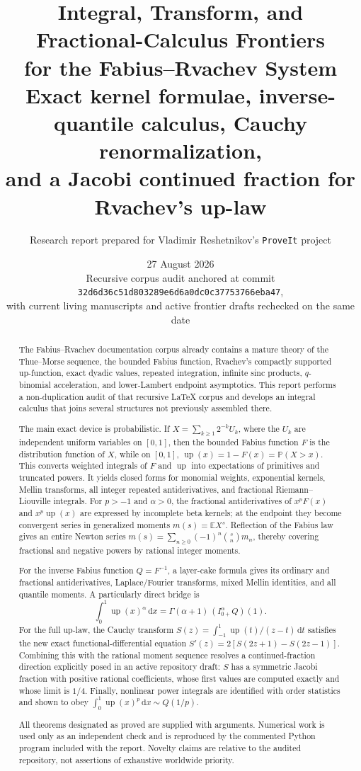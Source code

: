 \documentclass[11pt,oneside]{article}
\title{\bfseries Integral, Transform, and Fractional-Calculus Frontiers\\
for the Fabius--Rvachev System\\[0.45em]
\large Exact kernel formulae, inverse-quantile calculus, Cauchy renormalization,\\
and a Jacobi continued fraction for Rvachev's up-law}
\author{Research report prepared for Vladimir Reshetnikov's \texttt{ProveIt} project}
\date{27 August 2026\\
\small Recursive corpus audit anchored at commit \texttt{32d6d36c51d803289e6d6a0dc0c37753766eba47},\\
with current living manuscripts and active frontier drafts rechecked on the same date}
\numberwithin{equation}{section}
\theoremstyle{definition}
\theoremstyle{remark}
\newcommand{\Up}{\operatorname{up}}
\newcommand{\dd}{\,\mathrm d}
\newcommand{\E}{\mathbb E}
\newcommand{\Prob}{\mathbb P}
\begin{document}
\maketitle

\begin{abstract}
The Fabius--Rvachev documentation corpus already contains a mature theory of the
Thue--Morse sequence, the bounded Fabius function, Rvachev's compactly supported
up-function, exact dyadic values, repeated integration, infinite sinc products,
$q$-binomial acceleration, and lower-Lambert endpoint asymptotics.  This report
performs a non-duplication audit of that recursive LaTeX corpus and develops an
integral calculus that joins several structures not previously assembled there.

The main exact device is probabilistic.  If
\(X=\sum_{k\ge1}2^{-k}U_k\), where the \(U_k\) are independent uniform
variables on \([0,1]\), then the bounded Fabius function \(F\) is the distribution
function of \(X\), while on \([0,1]\),
\(\Up(x)=1-F(x)=\Prob(X>x)\).  This converts weighted integrals of \(F\)
and \(\Up\) into expectations of primitives and truncated powers.  It yields
closed forms for monomial weights, exponential kernels, Mellin transforms, all
integer repeated antiderivatives, and fractional Riemann--Liouville integrals.
For \(p>-1\) and \(\alpha>0\), the fractional antiderivatives of
\(x^pF(x)\) and \(x^p\Up(x)\) are expressed by incomplete beta kernels; at
the endpoint they become convergent series in generalized moments
\(m(s)=\E X^s\).  Reflection of the Fabius law gives an entire Newton series
\(m(s)=\sum_{n\ge0}(-1)^n\binom{s}{n}m_n\), thereby covering fractional and
negative powers by rational integer moments.

For the inverse Fabius function \(Q=F^{-1}\), a layer-cake formula gives its
ordinary and fractional antiderivatives, Laplace/Fourier transforms, mixed
Mellin identities, and all quantile moments.  A particularly direct bridge is
\[
 \int_0^1\Up(x)^\alpha\dd x
 =\Gamma(\alpha+1)\,(I_{0+}^{\alpha}Q)(1).
\]
For the full up-law, the Cauchy transform
\(S(z)=\int_{-1}^1\Up(t)/(z-t)\dd t\) satisfies the new exact
functional-differential equation
\(S'(z)=2[S(2z+1)-S(2z-1)]\).  Combining this with the rational moment
sequence resolves a continued-fraction direction explicitly posed in an active
repository draft: \(S\) has a symmetric Jacobi fraction with positive rational
coefficients, whose first values are computed exactly and whose limit is
\(1/4\).  Finally, nonlinear power integrals are identified with order
statistics and shown to obey
\(\int_0^1\Up(x)^p\dd x\sim Q(1/p)\).

All theorems designated as proved are supplied with arguments.  Numerical work
is used only as an independent check and is reproduced by the commented Python
program included with the report.  Novelty claims are relative to the audited
repository, not assertions of exhaustive worldwide priority.
\end{abstract}
\end{document}
